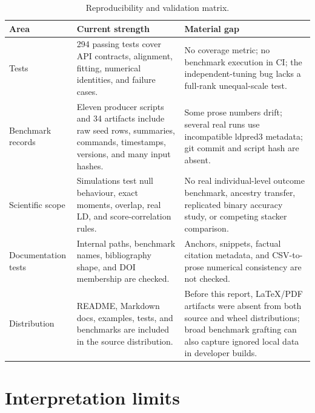 \documentclass[10pt,a4paper]{article}
\begin{document}
\begin{table}[H]
\centering
\caption{Reproducibility and validation matrix.}
\label{tab:reproducibility}
\scriptsize
\begin{tabularx}{\linewidth}{@{}L{30mm}Y Y@{}}
\toprule
\textbf{Area} & \textbf{Current strength} & \textbf{Material gap} \\
\midrule
Tests & 294 passing tests cover API contracts, alignment, fitting, numerical
identities, and failure cases. & No coverage metric; no benchmark execution in
CI; the independent-tuning bug lacks a full-rank unequal-scale test. \\
Benchmark records & Eleven producer scripts and 34 artifacts include raw
seed rows, summaries, commands, timestamps, versions, and many input hashes. &
Some prose numbers drift; several real runs use incompatible ldpred3 metadata;
git commit and script hash are absent. \\
Scientific scope & Simulations test null behaviour, exact moments, overlap,
real LD, and score-correlation rules. & No real individual-level outcome
benchmark, ancestry transfer, replicated binary accuracy study, or competing
stacker comparison. \\
Documentation tests & Internal paths, benchmark names, bibliography shape, and
DOI membership are checked. & Anchors, snippets, factual citation metadata, and
CSV-to-prose numerical consistency are not checked. \\
Distribution & README, Markdown docs, examples, tests, and benchmarks are
included in the source distribution. & Before this report, LaTeX/PDF artifacts
were absent from both source and wheel distributions; broad benchmark grafting
can also capture ignored local data in developer builds. \\
\bottomrule
\end{tabularx}
\end{table}

\section{Interpretation limits}
\label{sec:limits}
\end{document}
